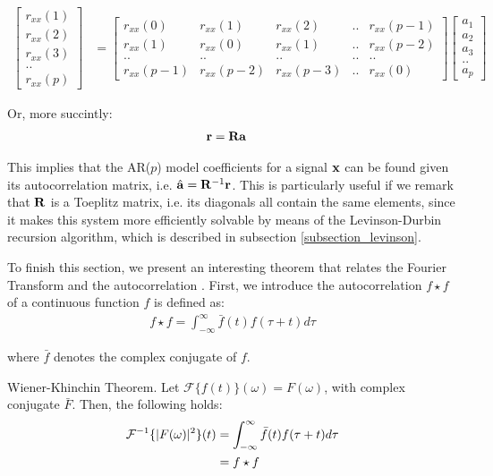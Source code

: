 \documentclass[../main.tex]{subfiles}
\begin{document}
\begin{align*}
\left[ \begin{array}{c} r_{xx}(1) \\ r_{xx}(2) \\ r_{xx}(3) \\ .. \\ r_{xx}(p)  \end{array} \right] &= \begin{bmatrix} r_{xx}(0) & r_{xx}(1) & r_{xx}(2) & .. & r_{xx}(p-1) \\ r_{xx}(1) & r_{xx}(0) & r_{xx}(1) & .. & r_{xx}(p-2) \\ .. & .. & .. & ..  & .. \\ r_{xx}(p-1) & r_{xx}(p-2) & r_{xx}(p-3) & .. & r_{xx}(0) \end{bmatrix} \left[ \begin{array}{c} a_1 \\ a_2 \\ a_3 \\ .. \\ a_p \end{array} \right]
\end{align*}
\par Or, more succintly:
\begin{align*}
\mathbf{r} &= \mathbf{Ra}
\end{align*}
\par This implies that the AR($p$) model coefficients for a signal $\mathbf{x}$ can be found given its autocorrelation matrix, i.e. $\hat{\mathbf{a}} = \mathbf{R}^{-1}\mathbf{r}$. This is particularly useful if we remark that $\mathbf{R}$ is a Toeplitz matrix, i.e. its diagonals all contain the same elements, since it makes this system more efficiently solvable by means of the Levinson-Durbin recursion algorithm, which is described in subsection \ref{subsection_levinson}.
\par To finish this section, we present an interesting theorem that relates the Fourier Transform and the autocorrelation \cite{Weisstein2015c}. First, we introduce the autocorrelation $f\star f$ of a continuous function $f$ is defined as:
\begin{align*}
f \star f = \int_{-\infty}^\infty{\bar{f}(t)f(\tau + t)d\tau}
\end{align*}
\par where $\bar{f}$ denotes the complex conjugate of $f$. 

\begin{theorem}{Wiener-Khinchin Theorem.} \label{thm_wiener}
Let $\mathcal{F}\{f(t)\}(\omega) = F(\omega)$, with complex conjugate $\bar{F}$. Then, the following holds:
\begin{align*}
\mathcal{F}^{-1}\{\lvert F(\omega)\rvert^2\}(t) &= \int_{-\infty}^\infty{\bar{f}(t)f(\tau + t)d\tau}\\
&= f \star f
\end{align*}
\end{theorem}
\end{document}
